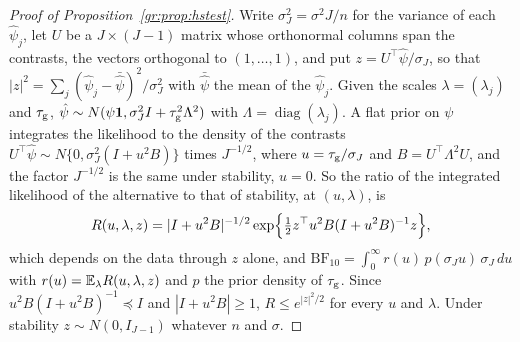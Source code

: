 \begin{proof}[Proof of Proposition~\ref{gr:prop:hstest}]
Write $\sigma_J^2=\sigma^2J/n$ for the variance of each $\hat\psi_j$, let $U$ be a $J\times(J-1)$ matrix whose orthonormal columns span the contrasts, the vectors orthogonal to $(1,\dots,1)$, and put $z=U^{\top}\hat\psi/\sigma_J$, so that $|z|^2=\sum_j(\hat\psi_j-\bar{\hat\psi})^2/\sigma_J^2$ with $\bar{\hat\psi}$ the mean of the $\hat\psi_j$. Given the scales $\lambda=(\lambda_j)$ and $\tau_{\mathrm{g}}$, $\hat\psi\sim N(\psi\mathbf 1,\sigma_J^2I+\tau_{\mathrm{g}}^2\Lambda^2)$ with $\Lambda=\operatorname{diag}(\lambda_j)$. A flat prior on $\psi$ integrates the likelihood to the density of the contrasts $U^{\top}\hat\psi\sim N\{0,\sigma_J^2(I+u^2B)\}$ times $J^{-1/2}$, where $u=\tau_{\mathrm{g}}/\sigma_J$ and $B=U^{\top}\Lambda^2U$, and the factor $J^{-1/2}$ is the same under stability, $u=0$. So the ratio of the integrated likelihood of the alternative to that of stability, at $(u,\lambda)$, is
\[
R(u,\lambda,z)=|I+u^2B|^{-1/2}\exp\Bigl\{\tfrac12z^{\top}u^2B(I+u^2B)^{-1}z\Bigr\},
\]
which depends on the data through $z$ alone, and $\mathrm{BF}_{10}=\int_0^\infty r(u)\,p(\sigma_Ju)\,\sigma_J\,du$ with $r(u)=\mathbb{E}_\lambda R(u,\lambda,z)$ and $p$ the prior density of $\tau_{\mathrm{g}}$. Since $u^2B(I+u^2B)^{-1}\preceq I$ and $|I+u^2B|\ge1$, $R\le e^{|z|^2/2}$ for every $u$ and $\lambda$. Under stability $z\sim N(0,I_{J-1})$ whatever $n$ and $\sigma$.


\end{proof}

